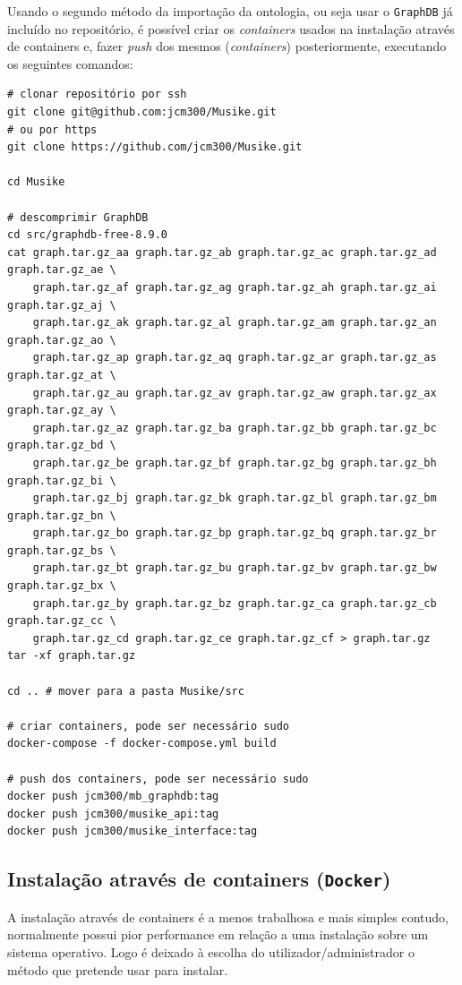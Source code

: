 \documentclass{article}
\begin{document}
Usando o segundo método da importação da ontologia, ou seja usar o \texttt{GraphDB} já incluído no repositório, é possível criar os \textit{containers} usados na instalação através de containers e, fazer \textit{push} dos mesmos (\textit{containers}) posteriormente, executando os seguintes comandos:

\begin{framed}
\begin{verbatim}
# clonar repositório por ssh
git clone git@github.com:jcm300/Musike.git
# ou por https
git clone https://github.com/jcm300/Musike.git

cd Musike

# descomprimir GraphDB
cd src/graphdb-free-8.9.0
cat graph.tar.gz_aa graph.tar.gz_ab graph.tar.gz_ac graph.tar.gz_ad graph.tar.gz_ae \
    graph.tar.gz_af graph.tar.gz_ag graph.tar.gz_ah graph.tar.gz_ai graph.tar.gz_aj \
    graph.tar.gz_ak graph.tar.gz_al graph.tar.gz_am graph.tar.gz_an graph.tar.gz_ao \
    graph.tar.gz_ap graph.tar.gz_aq graph.tar.gz_ar graph.tar.gz_as graph.tar.gz_at \
    graph.tar.gz_au graph.tar.gz_av graph.tar.gz_aw graph.tar.gz_ax graph.tar.gz_ay \
    graph.tar.gz_az graph.tar.gz_ba graph.tar.gz_bb graph.tar.gz_bc graph.tar.gz_bd \
    graph.tar.gz_be graph.tar.gz_bf graph.tar.gz_bg graph.tar.gz_bh graph.tar.gz_bi \
    graph.tar.gz_bj graph.tar.gz_bk graph.tar.gz_bl graph.tar.gz_bm graph.tar.gz_bn \
    graph.tar.gz_bo graph.tar.gz_bp graph.tar.gz_bq graph.tar.gz_br graph.tar.gz_bs \
    graph.tar.gz_bt graph.tar.gz_bu graph.tar.gz_bv graph.tar.gz_bw graph.tar.gz_bx \
    graph.tar.gz_by graph.tar.gz_bz graph.tar.gz_ca graph.tar.gz_cb graph.tar.gz_cc \
    graph.tar.gz_cd graph.tar.gz_ce graph.tar.gz_cf > graph.tar.gz
tar -xf graph.tar.gz

cd .. # mover para a pasta Musike/src

# criar containers, pode ser necessário sudo
docker-compose -f docker-compose.yml build

# push dos containers, pode ser necessário sudo
docker push jcm300/mb_graphdb:tag
docker push jcm300/musike_api:tag
docker push jcm300/musike_interface:tag
\end{verbatim}
\end{framed}

\subsection{Instalação através de containers (\texttt{Docker})}

A instalação através de containers é a menos trabalhosa e mais simples contudo, normalmente possui pior performance em relação a uma instalação sobre um sistema operativo. Logo é deixado à escolha do utilizador/administrador o método que pretende usar para instalar.
\end{document}
